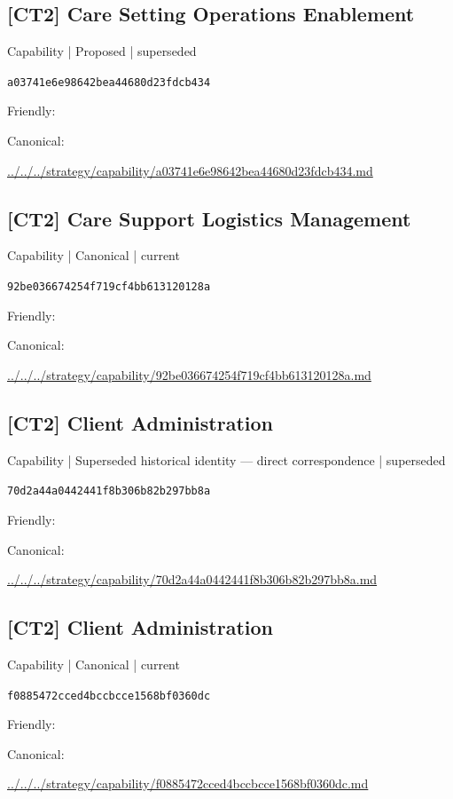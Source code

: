 \documentclass[10pt,a4paper]{article}
\begin{document}
\subsection*{[CT2] Care Setting Operations Enablement}
{\small Capability | Proposed | superseded}\par
\texttt{a03741e6e98642bea44680d23fdcb434}\par
Friendly: \par
Canonical: \par
{\footnotesize\url{../../../strategy/capability/a03741e6e98642bea44680d23fdcb434.md}}\par
\subsection*{[CT2] Care Support Logistics Management}
{\small Capability | Canonical | current}\par
\texttt{92be036674254f719cf4bb613120128a}\par
Friendly: \par
Canonical: \par
{\footnotesize\url{../../../strategy/capability/92be036674254f719cf4bb613120128a.md}}\par
\subsection*{[CT2] Client Administration}
{\small Capability | Superseded historical identity — direct correspondence | superseded}\par
\texttt{70d2a44a0442441f8b306b82b297bb8a}\par
Friendly: \par
Canonical: \par
{\footnotesize\url{../../../strategy/capability/70d2a44a0442441f8b306b82b297bb8a.md}}\par
\subsection*{[CT2] Client Administration}
{\small Capability | Canonical | current}\par
\texttt{f0885472cced4bccbcce1568bf0360dc}\par
Friendly: \par
Canonical: \par
{\footnotesize\url{../../../strategy/capability/f0885472cced4bccbcce1568bf0360dc.md}}\par
\end{document}
